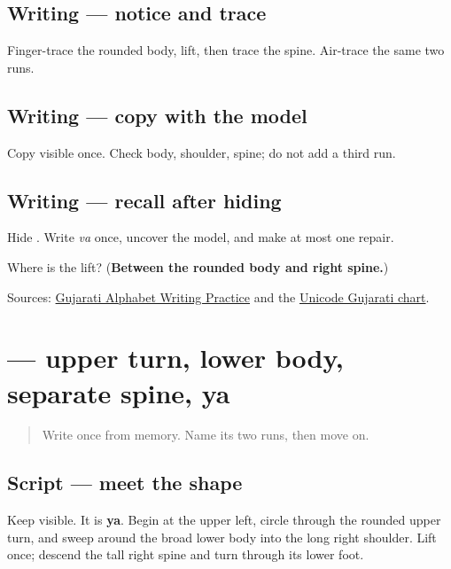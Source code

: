 \subsection*{Writing — notice and trace}

Finger-trace the rounded body, lift, then trace the spine. Air-trace the same two runs.

\subsection*{Writing — copy with the model}
Copy visible \textbf{} once. Check body, shoulder, spine; do not add a third run.

\subsection*{Writing — recall after hiding}
Hide \textbf{}. Write \emph{va} once, uncover the model, and make at most one repair.

\begin{tcolorbox}[breakable,colback=teal!4,colframe=teal!35!black,title={Before you move on}]
Where is the lift? (\textbf{Between the rounded body and right spine.})

Sources: \href{https://www.t30apps.com/gujarati-alphabet-writing/}{Gujarati Alphabet Writing Practice} and the \href{https://www.unicode.org/charts/PDF/U0A80.pdf}{Unicode Gujarati chart}.
\end{tcolorbox}
\section[\texorpdfstring{\gu{ય} (ya)}{ય (ya)}]{ — upper turn, lower body, separate spine, ya}

\label{lesson:GU-W02-ya}



\begin{quote}
Write \textbf{} once from memory. Name its two runs, then move on.
\end{quote}

\subsection*{Script — meet the shape}
Keep \textbf{} visible. It is \textbf{ya}. Begin at the upper left, circle through the rounded upper turn, and sweep around the broad lower body into the long right shoulder. Lift once; descend the tall right spine and turn through its lower foot.

